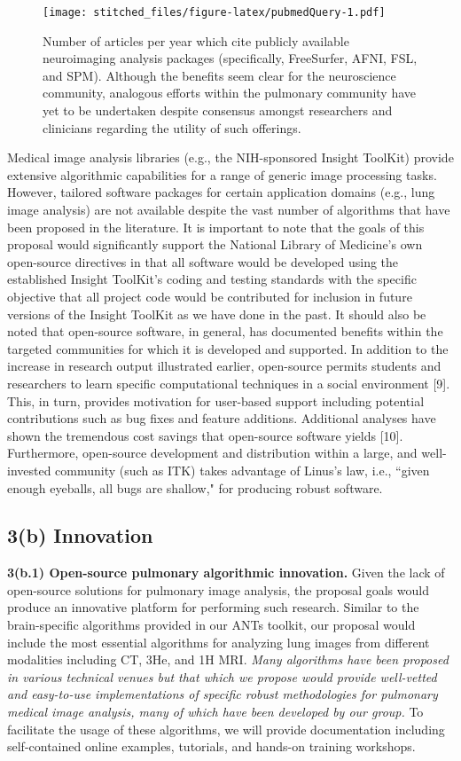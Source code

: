 \documentclass[11pt,]{article}
\begin{document}
\begin{figure}[htbp]
\centering
\texttt{[image: stitched\_files/figure-latex/pubmedQuery-1.pdf]}
\caption{Number of articles per year which cite publicly available
neuroimaging analysis packages (specifically, FreeSurfer, AFNI, FSL, and
SPM). Although the benefits seem clear for the neuroscience community,
analogous efforts within the pulmonary community have yet to be
undertaken despite consensus amongst researchers and clinicians
regarding the utility of such offerings.}
\end{figure}

Medical image analysis libraries (e.g., the NIH-sponsored Insight
ToolKit) provide extensive algorithmic capabilities for a range of
generic image processing tasks. However, tailored software packages for
certain application domains (e.g., lung image analysis) are not
available despite the vast number of algorithms that have been proposed
in the literature. It is important to note that the goals of this
proposal would significantly support the National Library of Medicine's
own open-source directives in that all software would be developed using
the established Insight ToolKit's coding and testing standards with the
specific objective that all project code would be contributed for
inclusion in future versions of the Insight ToolKit as we have done in
the past. It should also be noted that open-source software, in general,
has documented benefits within the targeted communities for which it is
developed and supported. In addition to the increase in research output
illustrated earlier, open-source permits students and researchers to
learn specific computational techniques in a social environment {[}9{]}.
This, in turn, provides motivation for user-based support including
potential contributions such as bug fixes and feature additions.
Additional analyses have shown the tremendous cost savings that
open-source software yields {[}10{]}. Furthermore, open-source
development and distribution within a large, and well-invested community
(such as ITK) takes advantage of Linus's law, i.e., ``given enough
eyeballs, all bugs are shallow," for producing robust software.

\subsection{\textbf{3(b) Innovation}}\label{b-innovation}

\textbf{3(b.1) Open-source pulmonary algorithmic innovation.} Given the
lack of open-source solutions for pulmonary image analysis, the proposal
goals would produce an innovative platform for performing such research.
Similar to the brain-specific algorithms provided in our ANTs toolkit,
our proposal would include the most essential algorithms for analyzing
lung images from different modalities including CT, 3He, and 1H MRI.
\emph{Many algorithms have been proposed in various technical venues but
that which we propose would provide well-vetted and easy-to-use
implementations of specific robust methodologies for pulmonary medical
image analysis, many of which have been developed by our group.} To
facilitate the usage of these algorithms, we will provide documentation
including self-contained online examples, tutorials, and hands-on
training workshops.
\end{document}
